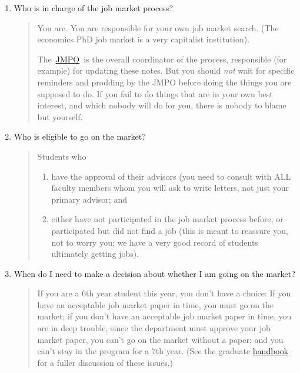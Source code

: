 \documentclass{\classes/econtex}
\providecommand\phantomsection{}
\begin{document}
\begin{enumerate}
\item Who is in charge of the job market process?
  \begin{quote}
    You are.  You are responsible for your own job market search.  (The economics PhD job market is a very capitalist institution).

    The~\href{\Notationpage}{JMPO}~is the overall coordinator of the process, responsible (for example) for updating these notes.  But you should \textit{not} wait for specific reminders and prodding by the JMPO before doing the things you are supposed to do. If you fail to do things that are in your own best interest, and which nobody will do for you, there is nobody to blame but yourself.

  \end{quote}

\item  Who is eligible to go on the market?
  \begin{quote}
    
    Students who

    \begin{enumerate}
      \item have the approval of their advisors (you need to consult with ALL faculty members whom you will ask to
        write letters, not just your primary advisor; and
        \item either have not participated in the job market process before,
    or participated but did not find a job (this is meant to reassure
    you, not to worry you; we have a very good record of students
    ultimately getting jobs).
    \end{enumerate}

    \phantomsection\hypertarget{DecideByWhen}{}
    
  \end{quote}

\item  When do I need to make a decision about whether I am going on
  the market?

  \begin{quote}
    If you are a 6th year student this year, you don't have a choice: If
    you have an acceptable job market paper in time, you must go on the
    market; if you don't have an acceptable job market paper in time, you
    are in deep trouble, since the department must approve your job market
    paper, you can't go on the market without a paper; and you can't stay
    in the program for a 7th year.  (See the graduate \href{https://www.econ2.jhu.edu/pdf/GraduateStudentHandbook_2024-2025.pdf}{handbook} for a fuller discussion of these issues.) 


\end{quote}
\end{enumerate}
\end{document}
